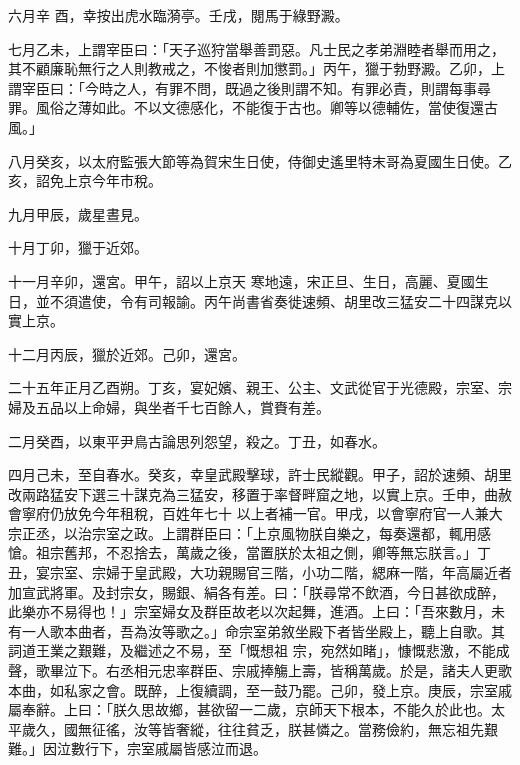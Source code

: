 \begin{pinyinscope}
 六月辛
 酉，幸按出虎水臨漪亭。壬戌，閱馬于綠野澱。



 七月乙未，上謂宰臣曰：「天子巡狩當舉善罰惡。凡士民之孝弟淵睦者舉而用之，其不顧廉恥無行之人則教戒之，不悛者則加懲罰。」丙午，獵于勃野澱。乙卯，上謂宰臣曰：「今時之人，有罪不問，既過之後則謂不知。有罪必責，則謂每事尋罪。風俗之薄如此。不以文德感化，不能復于古也。卿等以德輔佐，當使復還古風。」



 八月癸亥，以太府監張大節等為賀宋生日使，侍御史遙里特末哥為夏國生日使。乙亥，詔免上京今年市稅。



 九月甲辰，歲星晝見。



 十月丁卯，獵于近郊。



 十一月辛卯，還宮。甲午，詔以上京天
 寒地遠，宋正旦、生日，高麗、夏國生日，並不須遣使，令有司報諭。丙午尚書省奏徙速頻、胡里改三猛安二十四謀克以實上京。



 十二月丙辰，獵於近郊。己卯，還宮。



 二十五年正月乙酉朔。丁亥，宴妃嬪、親王、公主、文武從官于光德殿，宗室、宗婦及五品以上命婦，與坐者千七百餘人，賞賚有差。



 二月癸酉，以東平尹鳥古論思列怨望，殺之。丁丑，如春水。



 四月己未，至自春水。癸亥，幸皇武殿擊球，許士民縱觀。甲子，詔於速頻、胡里改兩路猛安下選三十謀克為三猛安，移置于率督畔窟之地，以實上京。壬申，曲赦會寧府仍放免今年租稅，百姓年七十
 以上者補一官。甲戌，以會寧府官一人兼大宗正丞，以治宗室之政。上謂群臣曰：「上京風物朕自樂之，每奏還都，輒用感愴。祖宗舊邦，不忍捨去，萬歲之後，當置朕於太祖之側，卿等無忘朕言。」丁丑，宴宗室、宗婦于皇武殿，大功親賜官三階，小功二階，緦麻一階，年高屬近者加宣武將軍。及封宗女，賜銀、絹各有差。曰：「朕尋常不飲酒，今日甚欲成醉，此樂亦不易得也！」宗室婦女及群臣故老以次起舞，進酒。上曰：「吾來數月，未有一人歌本曲者，吾為汝等歌之。」命宗室弟敘坐殿下者皆坐殿上，聽上自歌。其詞道王業之艱難，及繼述之不易，至「慨想祖
 宗，宛然如睹」，慷慨悲激，不能成聲，歌畢泣下。右丞相元忠率群臣、宗戚捧觴上壽，皆稱萬歲。於是，諸夫人更歌本曲，如私家之會。既醉，上復續調，至一鼓乃罷。己卯，發上京。庚辰，宗室戚屬奉辭。上曰：「朕久思故鄉，甚欲留一二歲，京師天下根本，不能久於此也。太平歲久，國無征徭，汝等皆奢縱，往往貧乏，朕甚憐之。當務儉約，無忘祖先艱難。」因泣數行下，宗室戚屬皆感泣而退。




\end{pinyinscope}
